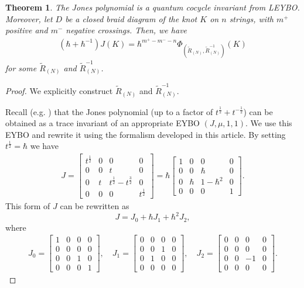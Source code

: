 \documentclass[11pt,fleqn]{amsart} %
\newtheorem{theorem}{Theorem}[section]
\begin{document}
\begin{theorem}\label{thm:Jones}
			The Jones polynomial is a 
			quantum cocycle invariant from LEYBO. 
			Moreover, let $D$ be a closed braid diagram of the knot $ K$ on $n$ strings, with $m^+$ positive  and $m^-$ negative crossings.
			Then, we have
			\begin{eqnarray*}
					(\hbar+\hbar^{-1})J(K) = \hbar^{m^+-m^--n} 
					\Phi_{(\tilde R_{(N)}, \tilde R^{-1}_{(N)}) }(K)
			\end{eqnarray*}
			for some 
			$\tilde R_{(N)}$ and $\tilde R^{-1}_{(N)}$. 
\end{theorem}
\begin{proof} 
		We explicitly construct  $\tilde R_{(N)}$ and $\tilde R^{-1}_{(N)}$. 
		
		Recall (e.g.  \cite{Ohtsuki})  that the Jones polynomial (up to a factor of $t^{\frac{1}{2}}+t^{-\frac{1}{2}}$)
		can be obtained as a trace invariant of an appropriate EYBO $(J,\mu, 1, 1)$. We use this EYBO and rewrite it using the formalism developed in this article. By  setting  $t^{\frac{1}{2}} = \hbar$ we have
			\begin{eqnarray*}
				J =  \begin{bmatrix}
					t^{\frac{1}{2}} & 0 & 0 & 0\\
					0 & 0 & t & 0\\
					0 & t & t^{\frac{1}{2}}-t^{\frac{3}{2}} & 0\\
					0 & 0 & 0 & t^{\frac{1}{2}}
				\end{bmatrix}
				= \hbar
				\begin{bmatrix}
						1 & 0 & 0 & 0\\
						0 & 0 & \hbar & 0\\
						0 & \hbar & 1-\hbar^2 & 0\\
						0 & 0 & 0 & 1
				\end{bmatrix}.
		\end{eqnarray*}
		 This  
		 form of $J$ can be rewritten as
		 $$J=J_0 + \hbar J_1 + \hbar^2 J_2, $$
where 	
	\begin{eqnarray*}
		J_0 = \begin{bmatrix}
		1 & 0 & 0 & 0\\
		0 & 0 & 0 & 0\\
		0 & 0 & 1 & 0\\
		0 & 0 & 0 & 1
		\end{bmatrix} ,
		\quad
		J_1= \begin{bmatrix}
		0 & 0 & 0 & 0\\
		0 & 0 & 1 & 0\\
		0 & 1 & 0 & 0\\
		0 & 0 & 0 & 0
		\end{bmatrix} ,
		\quad 
		J_2=		\begin{bmatrix}
	0 & 0 & 0 & 0\\
			0 & 0 & 0 & 0\\
			0 & 0 & -1 & 0\\
			0 & 0 & 0 & 0
		\end{bmatrix}.
	\end{eqnarray*}



\end{proof}
\end{document}
